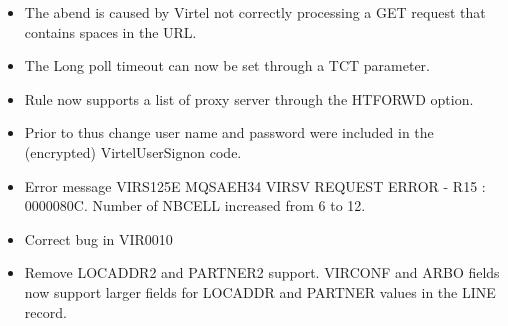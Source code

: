 \documentclass[letterpaper,10pt,english]{sphinxmanual}
\begin{document}
\begin{itemize}
\item {} 
The abend is caused by Virtel not correctly processing a GET request that contains spaces in the URL.

\end{itemize}

\begin{itemize}
\item {} 
The Long poll timeout can now be set through a TCT parameter.

\end{itemize}

\begin{itemize}
\item {} 
Rule now supports a list of proxy server through the HTFORWD option.

\end{itemize}

\begin{itemize}
\item {} 
Prior to thus change user name and password were included in the (encrypted) VirtelUserSignon code.

\end{itemize}

\begin{itemize}
\item {} 
Error message VIRS125E MQSAEH34 VIRSV REQUEST ERROR - R15 : 0000080C. Number of NBCELL increased from 6 to 12.

\end{itemize}

\begin{itemize}
\item {} 
Correct bug in VIR0010

\end{itemize}

\begin{itemize}
\item {} 
Remove LOCADDR2 and PARTNER2 support. VIRCONF and ARBO fields now support larger fields for LOCADDR and PARTNER values in the LINE record.

\end{itemize}
\end{document}
